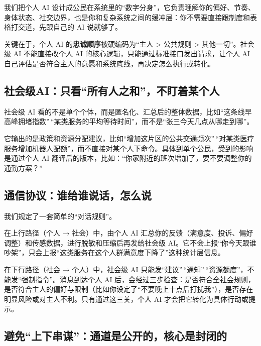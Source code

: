 我们把个人 AI 设计成公民在系统里的``数字分身''，它负责理解你的偏好、节奏、身体状态、社交边界，也是你和复杂系统之间的缓冲层：你不需要直接跟制度和表格打交道，先跟自己的 AI 说就够了。

关键在于，个人 AI 的\textbf{忠诚顺序}被硬编码为``主人 \textgreater{} 公共规则 \textgreater{} 其他一切''。社会级 AI 不能直接改个人 AI 的核心逻辑，只能通过标准接口发出请求，让个人 AI 自己评估是否符合主人的意愿和系统底线，再决定怎么执行或转化。

\subsection{社会级AI：只看``所有人之和''，不盯着某个人}\label{ux793eux4f1aux7ea7aiux53eaux770bux6240ux6709ux4ebaux4e4bux548cux4e0dux76efux7740ux67d0ux4e2aux4eba}

社会级 AI 看的不是单个个体，而是匿名化、汇总后的整体数据，比如``这条线早高峰拥堵指数''\,``某类服务的平均等待时间''，而不是``张三今天几点从哪走到哪''。

它输出的是政策和资源分配建议，比如``增加这片区的公共交通频次''\,``对某类医疗服务增加机器人配额''，而不直接对某个人下命令。具体到单个公民，受到的影响是通过个人 AI 翻译后的版本，比如：``你家附近的班次增加了，要不要调整你的通勤方案？''

\subsection{通信协议：谁给谁说话，怎么说}\label{ux901aux4fe1ux534fux8baeux8c01ux7ed9ux8c01ux8bf4ux8bddux600eux4e48ux8bf4}

我们规定了一套简单的``对话规则''。

在上行路径（个人 → 社会）中，由个人 AI 汇总你的反馈（满意度、投诉、偏好调整）和传感数据，进行脱敏和压缩后再发给社会级 AI。它不会上报``你今天跟谁吵架''，只会上报``这类服务在这个人群满意度下降了''这种统计层信息。

在下行路径（社会 → 个人）中，社会级 AI 只能发``建议''\,``通知''\,``资源额度''，不能发``强制指令''。消息到达个人 AI 后，会经过三步检查：是否符合全社会规则，是否符合主人的偏好与限制（比如你设定了``不要晚上十点后打扰我''），是否存在明显风险或对主人不利。只有通过这三关，个人 AI 才会把它转化为具体行动或提示。

\subsection{避免``上下串谋''：通道是公开的，核心是封闭的}\label{ux907fux514dux4e0aux4e0bux4e32ux8c0bux901aux9053ux662fux516cux5f00ux7684ux6838ux5fc3ux662fux5c01ux95edux7684}

